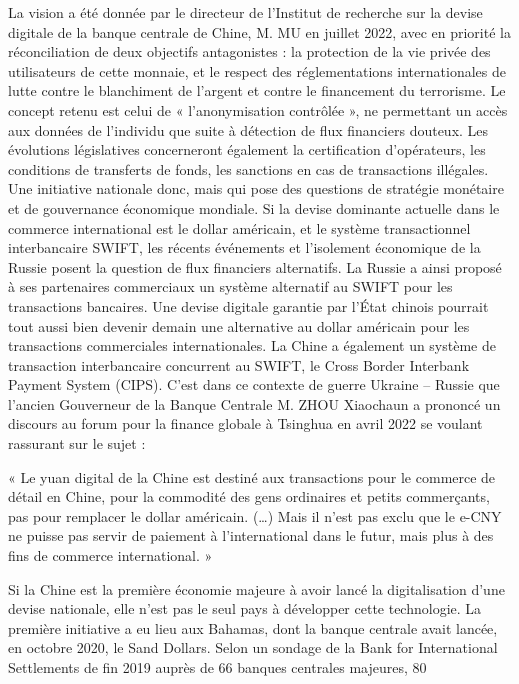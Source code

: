 La vision a été donnée par le directeur de l'Institut de recherche sur la devise digitale de la banque centrale de Chine, M. MU en juillet 2022, avec en priorité la réconciliation de deux objectifs antagonistes : la protection de la vie privée des utilisateurs de cette monnaie, et le respect des réglementations internationales de lutte contre le blanchiment de l’argent et contre le financement du terrorisme. Le concept retenu est celui de « l’anonymisation contrôlée », ne permettant un accès aux données de l’individu que suite à détection de flux financiers douteux. Les évolutions législatives concerneront également la certification d’opérateurs, les conditions de transferts de fonds, les sanctions en cas de transactions illégales. Une initiative nationale donc, mais qui pose des questions de stratégie monétaire et de gouvernance économique mondiale. Si la devise dominante actuelle dans le commerce international est le dollar américain, et le système transactionnel interbancaire SWIFT, les récents événements et l’isolement économique de la Russie posent la question de flux financiers alternatifs. La Russie a ainsi proposé à ses partenaires commerciaux un système alternatif au SWIFT pour les transactions bancaires. Une devise digitale garantie par l’État chinois pourrait tout aussi bien devenir demain une alternative au dollar américain pour les transactions commerciales internationales. La Chine a également un système de transaction interbancaire concurrent au SWIFT, le Cross Border Interbank Payment System (CIPS). C’est dans ce contexte de guerre Ukraine – Russie que l’ancien Gouverneur de la Banque Centrale M. ZHOU Xiaochaun a prononcé un discours au forum pour la finance globale à Tsinghua en avril 2022 se voulant rassurant sur le sujet : 

« Le yuan digital de la Chine est destiné aux transactions pour le commerce de détail en Chine, pour la commodité des gens ordinaires et petits commerçants, pas pour remplacer le dollar américain. (…) Mais il n’est pas exclu que le e-CNY ne puisse pas servir de paiement à l’international dans le futur, mais plus à des fins de commerce international. » 

Si la Chine est la première économie majeure à avoir lancé la digitalisation d’une devise nationale, elle n’est pas le seul pays à développer cette technologie. La première initiative a eu lieu aux Bahamas, dont la banque centrale avait lancée, en octobre 2020, le Sand Dollars. Selon un sondage de la Bank for International Settlements de fin 2019 auprès de 66 banques centrales majeures, 80 %

